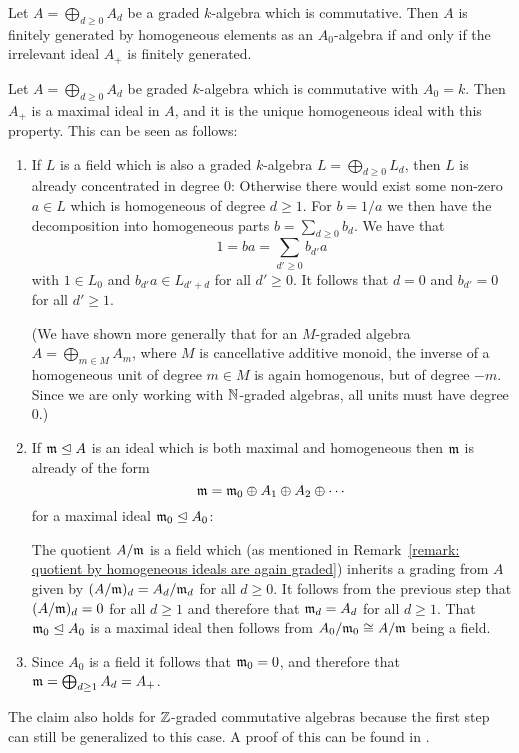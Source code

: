 

\begin{corollary}
  \label{corollary: finite homogeneous generatiors for irrelevant ideal}
  Let $A = \bigoplus_{d \geq 0} A_d$ be a graded $k$-algebra which is commutative.
  Then $A$ is finitely generated by homogeneous elements as an $A_0$-algebra if and only if the irrelevant ideal $A_+$ is finitely generated.
\end{corollary}


\begin{remark}
  Let $A = \bigoplus_{d \geq 0} A_d$ be graded $k$-algebra which is commutative with $A_0 = k$.
  Then $A_+$ is a maximal ideal in $A$, and it is the unique homogeneous ideal with this property.
  This can be seen as follows:
  \begin{enumerate}[label=\arabic*)]
    \item
      If $L$ is a field which is also a graded $k$-algebra $L = \bigoplus_{d \geq 0} L_d$, then $L$ is already concentrated in degree $0$:
      Otherwise there would exist some non-zero $a \in L$ which is homogeneous of degree $d \geq 1$.
      For $b = 1/a$ we then have the decomposition into homogeneous parts $b = \sum_{d \geq 0} b_d$.
      We have that
      \[
          1
        = b a
        = \sum_{d' \geq 0} b_{d'} a
      \]
      with $1 \in L_0$ and $b_{d'} a \in L_{d' + d}$ for all $d' \geq 0$.
      It follows that $d = 0$ and $b_{d'} = 0$ for all $d' \geq 1$.
      
      (We have shown more generally that for an $M$-graded algebra $A = \bigoplus_{m \in M} A_m$, where $M$ is cancellative additive monoid, the inverse of a homogeneous unit of degree $m \in M$ is again homogenous, but of degree $-m$.
      Since we are only working with $\mathbb{N}$-graded algebras, all units must have degree $0$.)
    \item
      If $\mathfrak{m} \trianglelefteq A$ is an ideal which is both maximal and homogeneous then $\mathfrak{m}$ is already of the form
      \[
          \mathfrak{m}
        = \mathfrak{m}_0 \oplus A_1 \oplus A_2 \oplus \dotsb
      \]
      for a maximal ideal $\mathfrak{m}_0 \trianglelefteq A_0$:
      
      The quotient $A/\mathfrak{m}$ is a field which (as mentioned in Remark~\ref{remark: quotient by homogeneous ideals are again graded}) inherits a grading from $A$ given by $(A/\mathfrak{m})_d = A_d / \mathfrak{m}_d$ for all $d \geq 0$.
      It follows from the previous step that $(A/\mathfrak{m})_d = 0$ for all $d \geq 1$ and therefore that $\mathfrak{m}_d = A_d$ for all $d \geq 1$.
      That $\mathfrak{m}_0 \trianglelefteq A_0$ is a maximal ideal then follows from $A_0/\mathfrak{m}_0 \cong A/\mathfrak{m}$ being a field.
    \item
      Since $A_0$ is a field it follows that $\mathfrak{m}_0 = 0$, and therefore that $\mathfrak{m} = \bigoplus_{d \geq 1} A_d = A_+$.
  \end{enumerate}
  The claim also holds for $\mathbb{Z}$-graded commutative algebras because the first step can still be generalized to this case.
  A proof of this can be found in \cite[Remark 1.3.10]{GradedRings2004}.
\end{remark}


